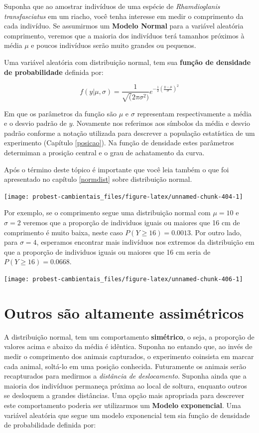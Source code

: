 \documentclass[
]{book}
\begin{document}
Suponha que ao amostrar indivíduos de uma espécie de \emph{Rhamdioglanis transfasciatus} em um riacho, você tenha interesse em medir o comprimento da cada indivíduo. Se assumirmos um \textbf{Modelo Normal} para a variável aleatória comprimento, veremos que a maioria dos indivíduos terá tamanhos próximos à média \(\mu\) e poucos indivíduos serão muito grandes ou pequenos.

Uma variável aleatória com distribuição normal, tem sua \textbf{função de densidade de probabilidade} definida por:

\[f(y|\mu,\sigma) = \frac{1}{\sqrt(2\pi\sigma^2)}e^{-\frac{1}{2}(\frac{y-\mu}{\sigma})^2}\]

Em que os parâmetros da função são \(\mu\) e \(\sigma\) representam respectivamente a média e o desvio padrão de \(y\). Novamente nos referimos aos símbolos da média e desvio padrão conforme a notação utilizada para descrever a população estatística de um experimento (Capítulo \ref{posicao}). Na função de densidade estes parâmetros determiman a prosição central e o grau de achatamento da curva.

Após o término deste tópico é importante que você leia também o que foi apresentado no capítulo \ref{normdist} sobre distribuição normal.

\begin{center}\texttt{[image: probest-cambientais\_files/figure-latex/unnamed-chunk-404-1]} \end{center}

Por exemplo, se o comprimento segue uma distribuição normal com \(\mu = 10\) e \(\sigma = 2\) veremos que a proporção de individuos iguais ou maiores que 16 cm de comprimento é muito baixa, neste caso \(P(Y \ge 16) = 0.0013\). Por outro lado, para \(\sigma = 4\), esperamos encontrar mais indivíduos nos extremos da distribuição em que a proporção de individuos iguais ou maiores que 16 cm seria de \(P(Y \ge 16) = 0.0668\).

\begin{center}\texttt{[image: probest-cambientais\_files/figure-latex/unnamed-chunk-406-1]} \end{center}

\hypertarget{outros-suxe3o-altamente-assimuxe9tricos}{%
\section{Outros são altamente assimétricos}\label{outros-suxe3o-altamente-assimuxe9tricos}}

A distribuição normal, tem um comportamento \textbf{simétrico}, o seja, a proporção de valores acima e abaixo da média é idêntica. Suponha no entando que, ao invés de medir o comprimento dos animais capturados, o experimento coinsista em marcar cada animal, soltá-lo em uma posição conhecida. Futuramente os animais serão recapturados para medirmos a \emph{distância de deslocamento}. Suponha ainda que a maioria dos indivíduos permaneça próxima ao local de soltura, enquanto outros se desloquem a grandes distâncias. Uma opção mais apropriada para descrever este comportamento poderia ser utilizarmos um \textbf{Modelo exponencial}. Uma variável aleatória que segue um modelo exponencial tem sia função de densidade de probabilidade definida por:
\end{document}
